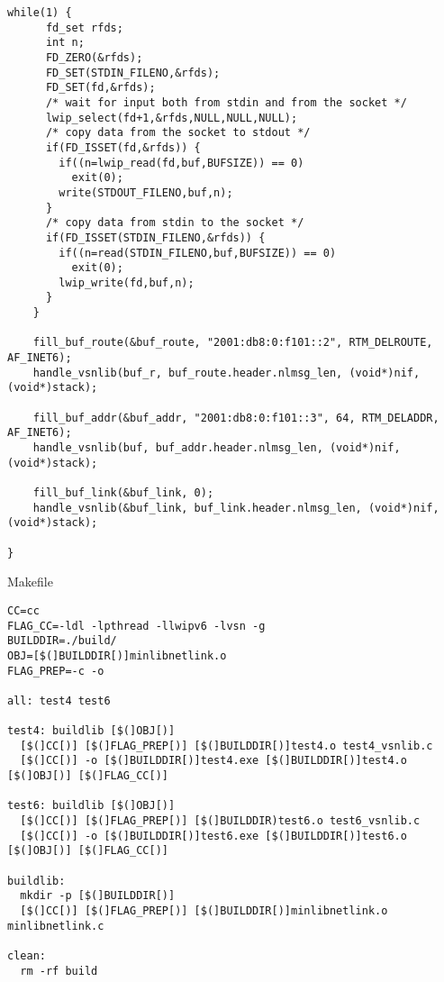 \begin{lstlisting}[style=CscriptStyle]
    while(1) {
      fd_set rfds;
      int n;
      FD_ZERO(&rfds);
      FD_SET(STDIN_FILENO,&rfds);
      FD_SET(fd,&rfds);
      /* wait for input both from stdin and from the socket */
      lwip_select(fd+1,&rfds,NULL,NULL,NULL);
      /* copy data from the socket to stdout */
      if(FD_ISSET(fd,&rfds)) {
        if((n=lwip_read(fd,buf,BUFSIZE)) == 0)
          exit(0);
        write(STDOUT_FILENO,buf,n);
      }
      /* copy data from stdin to the socket */
      if(FD_ISSET(STDIN_FILENO,&rfds)) {
        if((n=read(STDIN_FILENO,buf,BUFSIZE)) == 0)
          exit(0);
        lwip_write(fd,buf,n);
      }
    }

    fill_buf_route(&buf_route, "2001:db8:0:f101::2", RTM_DELROUTE, AF_INET6);
    handle_vsnlib(buf_r, buf_route.header.nlmsg_len, (void*)nif, (void*)stack);

    fill_buf_addr(&buf_addr, "2001:db8:0:f101::3", 64, RTM_DELADDR, AF_INET6);
    handle_vsnlib(buf, buf_addr.header.nlmsg_len, (void*)nif, (void*)stack);

    fill_buf_link(&buf_link, 0);
    handle_vsnlib(&buf_link, buf_link.header.nlmsg_len, (void*)nif, (void*)stack);

}
\end{lstlisting}

Makefile
\begin{lstlisting}[language=bashn, basicstyle=\ttfamily\scriptsize]
CC=cc
FLAG_CC=-ldl -lpthread -llwipv6 -lvsn -g
BUILDDIR=./build/
OBJ=[$(]BUILDDIR[)]minlibnetlink.o
FLAG_PREP=-c -o

all: test4 test6

test4: buildlib [$(]OBJ[)]
  [$(]CC[)] [$(]FLAG_PREP[)] [$(]BUILDDIR[)]test4.o test4_vsnlib.c
  [$(]CC[)] -o [$(]BUILDDIR[)]test4.exe [$(]BUILDDIR[)]test4.o [$(]OBJ[)] [$(]FLAG_CC[)]

test6: buildlib [$(]OBJ[)]
  [$(]CC[)] [$(]FLAG_PREP[)] [$(]BUILDDIR)test6.o test6_vsnlib.c
  [$(]CC[)] -o [$(]BUILDDIR[)]test6.exe [$(]BUILDDIR[)]test6.o [$(]OBJ[)] [$(]FLAG_CC[)]

buildlib:
  mkdir -p [$(]BUILDDIR[)]
  [$(]CC[)] [$(]FLAG_PREP[)] [$(]BUILDDIR[)]minlibnetlink.o minlibnetlink.c

clean:
  rm -rf build
\end{lstlisting}
